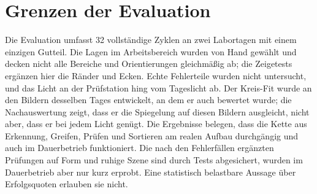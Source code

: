 \section{Grenzen der Evaluation}
\label{sec:eval-grenzen}

Die Evaluation umfasst 32 vollständige Zyklen an zwei Labortagen mit einem einzigen Gutteil.
Die Lagen im Arbeitsbereich wurden von Hand gewählt und decken nicht alle Bereiche und
Orientierungen gleichmäßig ab; die Zeigetests ergänzen hier die Ränder und Ecken. Echte
Fehlerteile wurden nicht untersucht, und das Licht an der Prüfstation hing vom Tageslicht ab.
Der Kreis-Fit wurde an den Bildern desselben Tages entwickelt, an dem er auch bewertet wurde;
die Nachauswertung zeigt, dass er die Spiegelung auf diesen Bildern ausgleicht, nicht aber,
dass er bei jedem Licht genügt. Die Ergebnisse belegen, dass die Kette aus Erkennung, Greifen,
Prüfen und Sortieren am realen Aufbau durchgängig und auch im Dauerbetrieb funktioniert. Die
nach den Fehlerfällen ergänzten Prüfungen auf Form und ruhige Szene sind durch Tests abgesichert,
wurden im Dauerbetrieb aber nur kurz erprobt. Eine statistisch
belastbare Aussage über Erfolgsquoten erlauben sie nicht.
